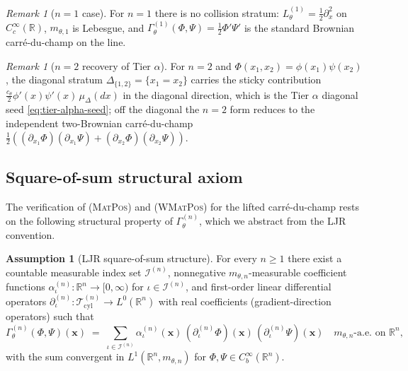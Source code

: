 \documentclass[11pt,reqno]{amsart}
\theoremstyle{plain}
\theoremstyle{definition}
\newtheorem{assumption}[theorem]{Assumption}
\theoremstyle{remark}
\newtheorem{remark}[theorem]{Remark}
\newcommand{\R}{\mathbb R}
\newcommand{\cT}{\mathcal T}
\newcommand{\cI}{\mathcal I}
\newcommand{\Tcyl}{\cT_{\mathrm{cyl}}}
\newcommand{\GamM}[1]{\Gamma^{(#1)}_{\theta}}
\newcommand{\Lth}[1]{L^{(#1)}_{\theta}}
\begin{document}
\begin{remark}[$n=1$ case]\label{rem:n1}
For $n=1$ there is no collision stratum:
$\Lth{1}=\tfrac12\partial_{x}^{2}$ on $C_{c}^{\infty}(\R)$,
$m_{\theta,1}$ is Lebesgue, and
$\GamM{1}(\Phi,\Psi)=\tfrac12\Phi'\Psi'$ is the standard Brownian
carr\'e-du-champ on the line.
\end{remark}

\begin{remark}[$n=2$ recovery of Tier $\alpha$]\label{rem:n2-tier-alpha}
For $n=2$ and $\Phi(x_{1},x_{2})=\phi(x_{1})\psi(x_{2})$, the
diagonal stratum $\Delta_{\{1,2\}}=\{x_{1}=x_{2}\}$ carries the
sticky contribution
$\frac{c_{\theta}}{2}\phi'(x)\psi'(x)\,\mu_{\Delta}(dx)$ in the
diagonal direction, which is the Tier $\alpha$ diagonal seed
\eqref{eq:tier-alpha-seed}; off the diagonal the $n=2$ form reduces to
the independent two-Brownian carr\'e-du-champ
$\tfrac12((\partial_{x_{1}}\Phi)(\partial_{x_{1}}\Psi)+(\partial_{x_{2}}\Phi)(\partial_{x_{2}}\Psi))$.
\end{remark}

\subsection{Square-of-sum structural axiom}\label{sec:LJR-sos}

The verification of {\normalfont\textsc{(MatPos)}} and
{\normalfont\textsc{(WMatPos)}} for the lifted carr\'e-du-champ
rests on the following structural property of $\GamM{n}$, which we
abstract from the LJR convention.

\begin{assumption}[LJR square-of-sum structure]\label{ax:sos}
For every $n\ge 1$ there exist a countable measurable index set
$\cI^{(n)}$, nonnegative $m_{\theta,n}$-measurable coefficient
functions $\alpha^{(n)}_{\iota}\colon\R^{n}\to[0,\infty)$ for
$\iota\in\cI^{(n)}$, and first-order linear differential operators
$\partial^{(n)}_{\iota}\colon\Tcyl^{(n)}\to L^{0}(\R^{n})$ with
real coefficients (gradient-direction operators) such that
\begin{equation}\label{eq:SOS}
  \GamM{n}(\Phi,\Psi)(\mathbf x)
  \;=\;\sum_{\iota\in\cI^{(n)}}
       \alpha^{(n)}_{\iota}(\mathbf x)\,
       (\partial^{(n)}_{\iota}\Phi)(\mathbf x)\,
       (\partial^{(n)}_{\iota}\Psi)(\mathbf x)
  \quad\text{$m_{\theta,n}$-a.e.\ on }\R^{n},
\end{equation}
with the sum convergent in $L^{1}(\R^{n},m_{\theta,n})$ for
$\Phi,\Psi\in C_{b}^{\infty}(\R^{n})$.
\end{assumption}
\end{document}
